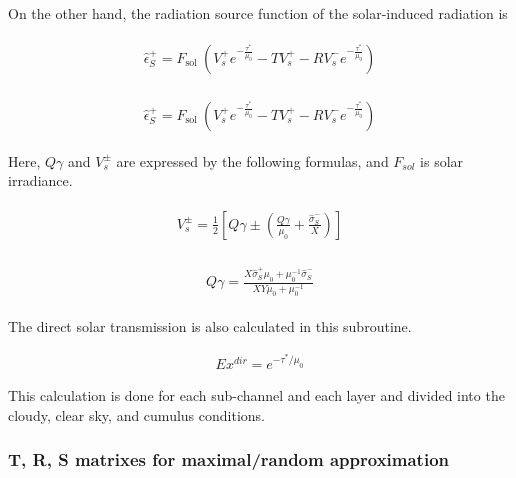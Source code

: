 On the other hand, the radiation source function of the solar-induced radiation is

\begin{eqnarray}
\begin{array}{l}
\hat{\epsilon}_{S}^{+}=F_{\text {sol }}\left(V_{s}^{+} e^{-\frac{\tau^{*}}{\mu_{0}}}-T V_{s}^{+}-R V_{s}^{-} e^{-\frac{\tau^{*}}{\mu_{0}}}\right)
\end{array}
\end{eqnarray}

\begin{eqnarray}
\begin{array}{l}
\hat{\epsilon}_{S}^{+}=F_{\text {sol }}\left(V_{s}^{+} e^{-\frac{\tau^{*}}{\mu_{0}}}-T V_{s}^{+}-R V_{s}^{-} e^{-\frac{\tau^{*}}{\mu_{0}}}\right)
\end{array}
\end{eqnarray}

Here, \(Q \gamma\) and \(V_{s}^{\pm}\) are expressed by the following formulas, and \(F_{sol}\) is solar irradiance.

\begin{eqnarray}
\begin{array}{c}
V_{s}^{\pm}=\frac{1}{2}\left[Q \gamma \pm\left(\frac{Q \gamma}{\mu_{0}}+\frac{\hat{\sigma}_{S}^{-}}{X}\right)\right]
\end{array}
\end{eqnarray}

\begin{eqnarray}
\begin{array}{c}
Q \gamma=\frac{X \hat{\sigma}_{S}^{+} \mu_{0}+\mu_{0}^{-1} \hat{\sigma}_{S}^{-}}{X Y \mu_{0}+\mu_{0}^{-1}}
\end{array}
\end{eqnarray}

The direct solar transmission is also calculated in this subroutine.

\begin{eqnarray}
E x^{d i r}=e^{-\tau^{*}/ \mu_{0}}
\end{eqnarray}

This calculation is done for each sub-channel and each layer and divided into the cloudy, clear sky, and cumulus conditions.

\hypertarget{t-r-s-matrixes-for-maximalrandom-approximation}{%
\subsubsection{T, R, S matrixes for maximal/random approximation}\label{t-r-s-matrixes-for-maximalrandom-approximation}}

